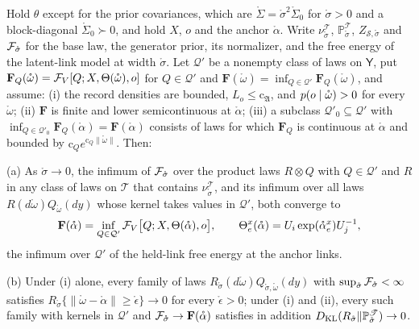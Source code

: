 Hold $\theta$ except for the prior covariances, which are $\mathring\Sigma=\mathring\sigma^2\mathring\Sigma_0$ for
$\mathring\sigma>0$ and a block-diagonal $\mathring\Sigma_0\succ0$, and hold $X$, $o$ and the anchor $\mathring\alpha$.
Write $\nu^{\mathscr T}_{\mathring\sigma}$, $\mathbb P^{\mathscr T}_{\mathring\sigma}$, $Z_{\mathscr S,\mathring\sigma}$ and
$\mathcal F_{\mathring\sigma}$ for the base law, the generator prior, its normalizer, and the free energy of the
latent-link model at width $\mathring\sigma$. Let $\mathcal Q'$ be a nonempty class of laws on $\mathsf Y$, put
$\mathbf F_Q(\mathring\omega)=\mathcal F_V[Q;X,\Theta(\mathring\omega),o]$ for $Q\in\mathcal Q'$ and
$\mathbf F(\mathring\omega)=\inf_{Q\in\mathcal Q'}\mathbf F_Q(\mathring\omega)$, and assume:
(i) the record densities are bounded, $L_o\leq\mathrm c_{\mathfrak A}$, and $p(o\mid\mathring\omega)>0$ for every
$\mathring\omega$;
(ii) $\mathbf F$ is finite and lower semicontinuous at $\mathring\alpha$;
(iii) a subclass $\mathcal Q'_0\subseteq\mathcal Q'$ with $\inf_{Q\in\mathcal Q'_0}\mathbf F_Q(\mathring\alpha)=\mathbf F(\mathring\alpha)$
consists of laws for which $\mathbf F_Q$ is continuous at $\mathring\alpha$ and bounded by
$\mathrm c_Qe^{\mathrm c_Q\lVert\mathring\omega\rVert}$.
Then:

(a) As $\mathring\sigma\to0$, the infimum of $\mathcal F_{\mathring\sigma}$ over the product laws $R\otimes Q$ with
$Q\in\mathcal Q'$ and $R$ in any class of laws on $\mathscr T$ that contains $\nu^{\mathscr T}_{\mathring\sigma}$, and its
infimum over all laws $R(d\mathring\omega)Q_{\mathring\omega}(dy)$ whose kernel takes values in $\mathcal Q'$, both
converge to
\begin{equation}
\mathbf F(\mathring\alpha)=\inf_{Q\in\mathcal Q'}\mathcal F_V\bigl[Q;X,\Theta(\mathring\alpha),o\bigr],
\qquad
\Theta^x_e(\mathring\alpha)=U_i\exp(\mathring\alpha^x_e)U_j^{-1},
\label{eq:link-held-limit}
\end{equation}
the infimum over $\mathcal Q'$ of the held-link free energy at the anchor links.

(b) Under (i) alone, every family of laws $R_{\mathring\sigma}(d\mathring\omega)Q_{\mathring\sigma,\mathring\omega}(dy)$ with
$\sup_{\mathring\sigma}\mathcal F_{\mathring\sigma}<\infty$ satisfies
$R_{\mathring\sigma}\{\lVert\mathring\omega-\mathring\alpha\rVert\geq\mathring\epsilon\}\to0$ for every $\mathring\epsilon>0$; under (i)
and (ii),
every such family with kernels in $\mathcal Q'$ and $\mathcal F_{\mathring\sigma}\to\mathbf F(\mathring\alpha)$ satisfies in
addition $D_{\mathrm{KL}}(R_{\mathring\sigma}\Vert\mathbb P^{\mathscr T}_{\mathring\sigma})\to0$.

